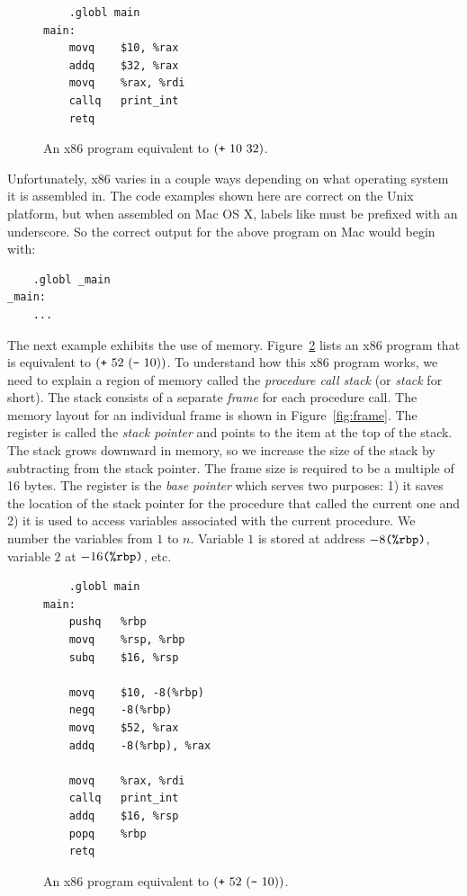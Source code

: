 \documentclass[11pt]{book}
\begin{document}
\begin{figure}[tbp]
\begin{lstlisting}
	.globl main
main:
	movq	$10, %rax
	addq	$32, %rax
	movq	%rax, %rdi
	callq	print_int
	retq
\end{lstlisting}
\caption{An x86 program equivalent to $(\texttt{+}~10~32)$.}
\label{fig:p0-x86}
\end{figure}

Unfortunately, x86 varies in a couple ways depending on what
operating system it is assembled in. The code examples shown here are
correct on the Unix platform, but when assembled on Mac OS X, labels
like  must be prefixed with an underscore.  So the correct
output for the above program on Mac would begin with:
\begin{lstlisting}
	.globl _main
_main:
	...
\end{lstlisting}

The next example exhibits the use of memory.  Figure~\ref{fig:p1-x86}
lists an x86 program that is equivalent to $(\texttt{+}~52~
  (\texttt{-}~10) )$. To understand how this x86 program works, we
need to explain a region of memory called the \emph{procedure call
  stack} (or \emph{stack} for short). The stack consists of a separate
\emph{frame} for each procedure call. The memory layout for an
individual frame is shown in Figure~\ref{fig:frame}.  The register
 is called the \emph{stack pointer} and points to the item at
the top of the stack. The stack grows downward in memory, so we
increase the size of the stack by subtracting from the stack
pointer. The frame size is required to be a multiple of 16 bytes. The
register  is the \emph{base pointer} which serves two
purposes: 1) it saves the location of the stack pointer for the
procedure that called the current one and 2) it is used to access
variables associated with the current procedure. We number the
variables from $1$ to $n$. Variable $1$ is stored at address
$-8\texttt{(\%rbp)}$, variable $2$ at $-16\texttt{(\%rbp)}$, etc.

\begin{figure}[tbp]
\begin{lstlisting}
	.globl main
main:
	pushq	%rbp
	movq	%rsp, %rbp
	subq	$16, %rsp

	movq	$10, -8(%rbp)
	negq	-8(%rbp)
	movq	$52, %rax
	addq	-8(%rbp), %rax

	movq	%rax, %rdi
	callq	print_int
	addq	$16, %rsp
	popq	%rbp
	retq
\end{lstlisting}
\caption{An x86 program equivalent to $(\texttt{+}~52~(\texttt{-}~10) )$.}
\label{fig:p1-x86}
\end{figure}
\end{document}
